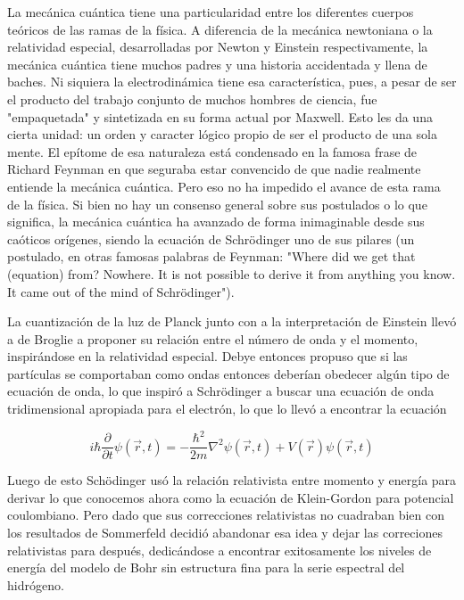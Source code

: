 \documentclass[a4paper, 12pt]{article} %
\begin{document}
La mec\'anica cu\'antica tiene una particularidad entre los diferentes cuerpos te\'oricos de las ramas de la f\'isica. A diferencia de la mec\'anica newtoniana o la relatividad especial, desarrolladas por Newton y Einstein respectivamente, la mec\'anica cu\'antica tiene muchos padres y una historia accidentada y llena de baches. Ni siquiera la electrodin\'amica tiene esa caracter\'istica, pues, a pesar de ser el producto del trabajo conjunto de muchos hombres de ciencia, fue "empaquetada" y sintetizada en su forma actual por Maxwell. Esto les da una cierta unidad: un orden y caracter l\'ogico propio de ser el producto de una sola mente. El ep\'itome de esa naturaleza est\'a condensado en la famosa frase de Richard Feynman en que seguraba estar convencido de que nadie realmente entiende la mec\'anica cu\'antica. Pero eso no ha impedido el avance de esta rama de la f\'isica. Si bien no hay un consenso general sobre sus postulados o lo que significa, la mec\'anica cu\'antica ha avanzado de forma inimaginable desde sus ca\'oticos or\'igenes, siendo la ecuaci\'on de Schr\"odinger uno de sus pilares (un postulado, en otras famosas palabras de Feynman: "Where did we get that (equation) from? Nowhere. It is not possible to derive it from anything you know. It came out of the mind of Schr\"odinger").

La cuantizaci\'on de la luz de Planck junto con a la interpretaci\'on de Einstein llev\'o a de Broglie a proponer su relaci\'on entre el n\'umero de onda y el momento, inspir\'andose en la relatividad especial. Debye entonces propuso que si las part\'iculas se comportaban como ondas entonces deber\'ian obedecer alg\'un tipo de ecuaci\'on de onda, lo que inspir\'o a Schr\"odinger a buscar una ecuaci\'on de onda tridimensional apropiada para el electr\'on, lo que lo llev\'o a encontrar la ecuaci\'on

\begin{equation}
i\hbar\frac{\partial}{\partial t} \psi (\vec{r}, t)=-\frac{\hbar^2}{2m}\nabla^2  \psi (\vec{r}, t) + V(\vec{r}) \psi (\vec{r}, t)
\end{equation}

Luego de esto Sch\"odinger us\'o la relaci\'on relativista entre momento y energ\'ia para derivar lo que conocemos ahora como la ecuaci\'on de Klein-Gordon para potencial coulombiano. Pero dado que sus correcciones relativistas no cuadraban bien con los resultados de Sommerfeld decidi\'o abandonar esa idea y dejar las correciones relativistas para despu\'es, dedic\'andose a encontrar exitosamente los niveles de energ\'ia del modelo de Bohr sin estructura fina para la serie espectral del hidr\'ogeno. 
\end{document}
